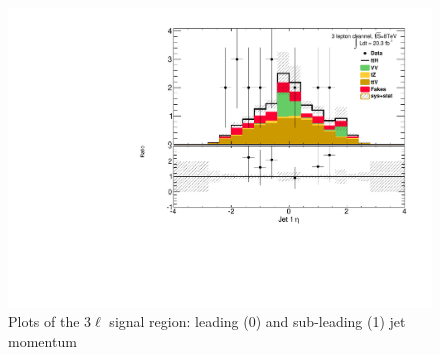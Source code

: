 \begin{figure}[!htbp]
\begin{minipage}[h]{0.5\textwidth}
  \end{minipage}\hfill
  \begin{minipage}[h]{0.5\textwidth}
    \centering \includegraphics[width=\textwidth]{figs/results/plotCand_3lep_Jet1Eta}
  \end{minipage}\hfill
\caption{Plots of the 3$\ell$ signal region: leading (0) and sub-leading (1) jet momentum}  
\label{figure:results_3l_jet}  
\end{figure} 


